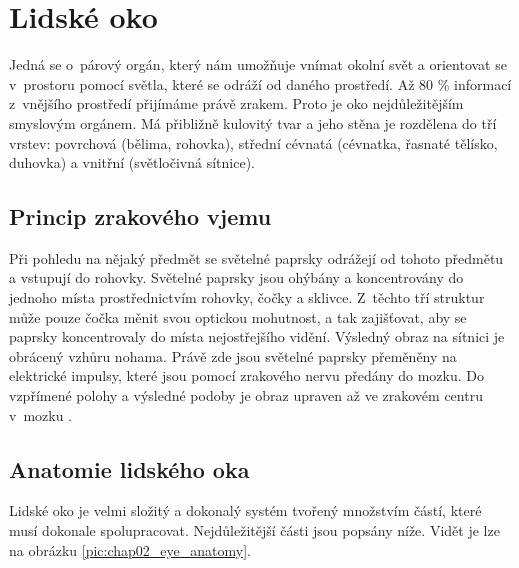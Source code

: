 \chapter{Lidské oko}
\label{ch:oko}
Jedná se o~párový orgán, který nám umožňuje vnímat okolní svět a orientovat se v~prostoru pomocí světla, které se odráží od daného prostředí. Až 80 \% \cite{biofyzika} informací z~vnějšího prostředí přijímáme právě zrakem. Proto je oko nejdůležitějším smyslovým orgánem. Má přibližně kulovitý tvar a jeho stěna je rozdělena do tří vrstev: povrchová (bělima, rohovka), střední cévnatá (cévnatka, řasnaté tělísko, duhovka) a vnitřní (světločivná sítnice).

\section{Princip zrakového vjemu}
Při pohledu na nějaký předmět se světelné paprsky odrážejí od tohoto předmětu a vstupují do rohovky. Světelné paprsky jsou ohýbány a koncentrovány do jednoho místa prostřednictvím rohovky, čočky a sklivce. Z~těchto tří struktur může pouze čočka měnit svou optickou mohutnost, a tak zajišťovat, aby se paprsky koncentrovaly do místa nejostřejšího vidění. Výsledný obraz na sítnici je obrácený vzhůru nohama. Právě zde jsou světelné paprsky přeměněny na elektrické impulsy, které jsou pomocí zrakového nervu předány do mozku. Do vzpřímené polohy a výsledné podoby je obraz upraven až ve zrakovém centru v~mozku \cite{biofyzika}.

\section{Anatomie lidského oka}
Lidské oko je velmi složitý a dokonalý systém tvořený množstvím částí, které musí dokonale spolupracovat. Nejdůležitější části jsou popsány níže. Vidět je lze na obrázku \ref{pic:chap02_eye_anatomy}.

